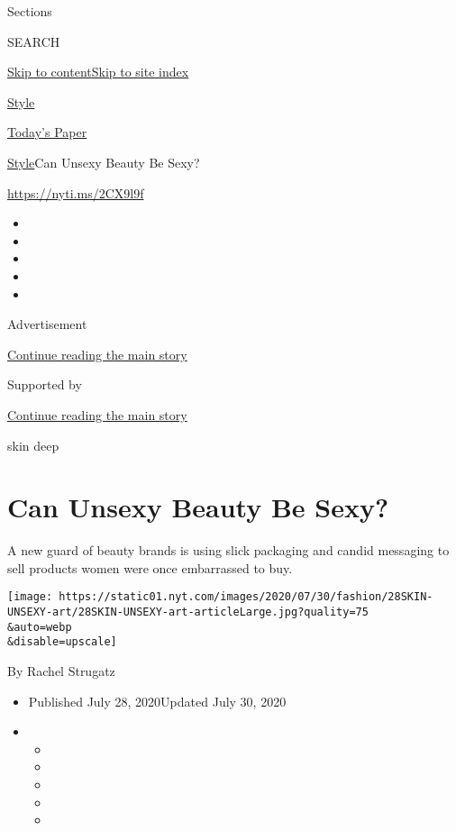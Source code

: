 Sections

SEARCH

\protect\hyperlink{site-content}{Skip to
content}\protect\hyperlink{site-index}{Skip to site index}

\href{https://www.nytimes.com/section/style}{Style}

\href{https://myaccount.nytimes.com/auth/login?response_type=cookie\&client_id=vi}{}

\href{https://www.nytimes.com/section/todayspaper}{Today's Paper}

\href{/section/style}{Style}\textbar{}Can Unsexy Beauty Be Sexy?

\url{https://nyti.ms/2CX9l9f}

\begin{itemize}
\item
\item
\item
\item
\item
\end{itemize}

Advertisement

\protect\hyperlink{after-top}{Continue reading the main story}

Supported by

\protect\hyperlink{after-sponsor}{Continue reading the main story}

skin deep

\hypertarget{can-unsexy-beauty-be-sexy}{%
\section{Can Unsexy Beauty Be Sexy?}\label{can-unsexy-beauty-be-sexy}}

A new guard of beauty brands is using slick packaging and candid
messaging to sell products women were once embarrassed to buy.

\texttt{[image: https://static01.nyt.com/images/2020/07/30/fashion/28SKIN-UNSEXY-art/28SKIN-UNSEXY-art-articleLarge.jpg?quality=75\\\&auto=webp\\\&disable=upscale]}

By Rachel Strugatz

\begin{itemize}
\item
  Published July 28, 2020Updated July 30, 2020
\item
  \begin{itemize}
  \item
  \item
  \item
  \item
  \item
  \end{itemize}
\end{itemize}

